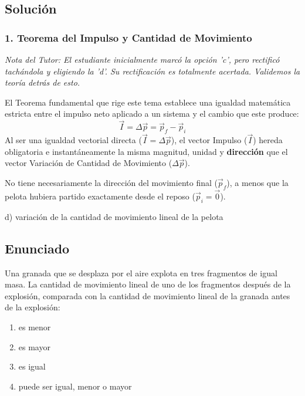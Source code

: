 \documentclass[12pt, a4paper]{article}
\begin{document}
\subsection*{Solución}

\subsubsection*{1. Teorema del Impulso y Cantidad de Movimiento}
\textit{Nota del Tutor: El estudiante inicialmente marcó la opción 'c', pero rectificó tachándola y eligiendo la 'd'. Su rectificación es totalmente acertada. Validemos la teoría detrás de esto.}

El Teorema fundamental que rige este tema establece una igualdad matemática estricta entre el impulso neto aplicado a un sistema y el cambio que este produce:
$$ \vec{I} = \Delta\vec{p} = \vec{p}_f - \vec{p}_i $$
Al ser una igualdad vectorial directa ($\vec{I} = \Delta\vec{p}$), el vector Impulso ($\vec{I}$) hereda obligatoria e instantáneamente la misma magnitud, unidad y \textbf{dirección} que el vector Variación de Cantidad de Movimiento ($\Delta\vec{p}$). 

No tiene necesariamente la dirección del movimiento final ($\vec{p}_f$), a menos que la pelota hubiera partido exactamente desde el reposo ($\vec{p}_i = \vec{0}$).

\begin{tcolorbox}[colback=green!5!white, colframe=green!50!black, title=Respuesta Final]
\centering \Large d) variación de la cantidad de movimiento lineal de la pelota
\end{tcolorbox}

\newpage

\subsection*{Enunciado}
Una granada que se desplaza por el aire explota en tres fragmentos de igual masa. La cantidad de movimiento lineal de uno de los fragmentos después de la explosión, comparada con la cantidad de movimiento lineal de la granada antes de la explosión:
\begin{enumerate}[label=\alph*)]
    \item es menor
    \item es mayor
    \item es igual
    \item puede ser igual, menor o mayor
\end{enumerate}
\end{document}
